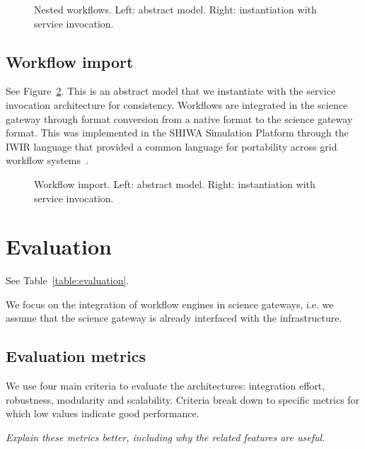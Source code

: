 \documentclass[preprint,3p,twocolumn]{elsarticle}
\newcommand{\todo}[1]{\color{blue}\xspace\emph{#1}\xspace\color{black}}
\begin{document}
\begin{figure}
\centering
\def\svgwidth{0.48\columnwidth}

\def\svgwidth{0.48\columnwidth}

\caption{Nested workflows. Left: abstract model. Right: instantiation with service invocation.}
\label{archi:nested}
\end{figure}

\subsection{Workflow import}

See Figure~\ref{archi:import}. This is an abstract model that we
instantiate with the service invocation architecture for
consistency. Workflows are integrated in the science gateway through
format conversion from a native format to the science gateway
format. This was implemented in the SHIWA Simulation Platform through
the IWIR language that provided a common language for portability
across grid workflow
systems~\cite{plankensteiner-prodan-etal:2013}.

\begin{figure}
\centering
\def\svgwidth{0.48\columnwidth}

\def\svgwidth{0.48\columnwidth}

\caption{Workflow import. Left: abstract model. Right: instantiation with service invocation.}
\label{archi:import}
\end{figure}


\section{Evaluation}

See Table~\ref{table:evaluation}.

We focus on the integration of workflow engines in science gateways,
i.e. we assume that the science gateway is already interfaced with the
infrastructure. 

\subsection{Evaluation metrics}

We use four main criteria to evaluate the architectures: integration
effort, robustness, modularity and scalability. Criteria break down to
specific metrics for which low values indicate good performance.

\todo{Explain these metrics better, including why the related features
  are useful.}
\end{document}
